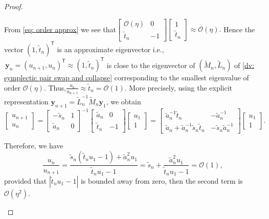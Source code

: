 \documentclass[11pt]{article}
\numberwithin{equation}{section}
\begin{document}
\begin{proof}
\begin{itemize}
    From \eqref{eq: order approx} we see that$
    \begin{bmatrix}
\mathcal{O}(\eta) & 0 \\
\widetilde{t}_n & -1
\end{bmatrix}
\begin{bmatrix}
1 \\
\widetilde{t}_n
\end{bmatrix}
\approx \mathcal{O}(\eta).
$ Hence the vector $(1, \widetilde{t}_n)^{\mathsf{T}}$ is an approximate eigenvector
i.e.,$\, \boldsymbol{y}_n = (u_{n+1},u_n)^{\mathsf{T}} \approx (1,\widetilde{t}_n)^{\mathsf{T}} $
is close to the eigenvector of $(\widetilde{M}_n,\widetilde{L}_n)$ of \eqref{dv: symplectic pair swap and collapse} corresponding  to the smallest eigenvalue of order $\mathcal{O}(\eta)$.
Thus,$ \frac{u_n}{u_{n+1}} \approx \widetilde{t}_n = \mathcal{O}(1).$ More precisely, using the explicit representation $\boldsymbol{y}_{n+1}=\widetilde{L}_n^{-1}\widetilde{M}_n\boldsymbol{y}_1$, we obtain
$$
\begin{bmatrix}
u_{n+1} \\
u_n
\end{bmatrix}
=
\begin{bmatrix}
-\widetilde{s}_n & 1 \\
\widetilde{a}_n & 0
\end{bmatrix}^{-1}
\begin{bmatrix}
\widetilde{a}_n & 0 \\
\widetilde{t}_n & -1
\end{bmatrix}
\begin{bmatrix}
u_1 \\
1
\end{bmatrix}
=
\begin{bmatrix}
\widetilde{a}_n^{-1}\widetilde{t}_n & -\widetilde{a}_n^{-1} \\
\widetilde{a}_n +  \widetilde{a}_n^{-1}\widetilde{s}_n\widetilde{t}_n& -\widetilde{s}_n \widetilde{a}_n^{-1}
\end{bmatrix}
\begin{bmatrix}
u_1 \\
1
\end{bmatrix}.
$$

Therefore, we have
\begin{equation} \label{eq: ratio order}
\frac{u_n}{u_{n+1}}
=
\frac{\widetilde{s}_n(\widetilde{t}_n u_1 -1) + \widetilde{a}_n^2 u_1}
{\widetilde{t}_n u_1 -1}
=
\widetilde{s}_n + \frac{\widetilde{a}_n^2 u_1}{\widetilde{t}_n u_1 -1}
= \mathcal{O}(1),
\end{equation}
provided that $|\widetilde{t}_n u_1-1|$ is bounded away from zero, then the second term is
$\mathcal{O}(\eta^2)$.



\end{itemize}
\end{proof}
\end{document}
